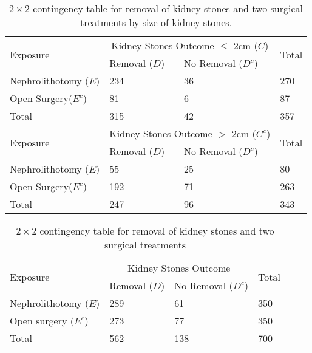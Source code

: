 \begin{customArrayStretch}{1.2}
\begin{table}[H]
    \centering
    \begin{tabular}{|l|l|l|l|}
        \hline
        \multirow{2}{*}{Exposure} & \multicolumn{2}{c|}{Kidney Stones Outcome $\leq$ 2cm ($C$)} & \multirow{2}{*}{Total}\\
        \cline{2-3}
        & Removal ($D$) & No Removal ($D^c$) & \\
        \hline
        Nephrolithotomy ($E$) & 234 & 36 & 270 \\ \hline
        Open Surgery($E^c$) & 81 & 6 & 87 \\ \hline
        Total & 315 & 42 & 357 \\

        \hline \hline

        \hline
        \multirow{2}{*}{Exposure} & \multicolumn{2}{c|}{Kidney Stones Outcome $>$ 2cm ($C^c$)} & \multirow{2}{*}{Total}\\
        \cline{2-3}
        & Removal ($D$) & No Removal ($D^c$) & \\
        \hline

        Nephrolithotomy ($E$) & 55 & 25 & 80 \\ \hline
        Open Surgery($E^c$) & 192 & 71 & 263 \\ \hline
        Total & 247 & 96 & 343 \\ \hline
    \end{tabular}
    \caption{
        $2 \times 2$ contingency table for removal of kidney stones and two surgical treatments by size of kidney stones.
        \cite{statistics/book/Statistics-for-Data-Scientists/Maurits-Kaptein}
    }
\end{table}

\begin{table}[H]
    \centering
    \begin{tabular}{|l|l|l|l|}
        \hline
        \multirow{2}{*}{Exposure} & \multicolumn{2}{c|}{Kidney Stones Outcome} & \multirow{2}{*}{Total}\\
        \cline{2-3}
        & Removal ($D$) & No Removal ($D^c$) & \\
        \hline

        Nephrolithotomy ($E$) & 289 & 61 & 350 \\ \hline
        Open surgery ($E^c$) & 273 & 77 & 350 \\ \hline
        Total & 562 & 138 & 700 \\ \hline
    \end{tabular}
    \caption{
        $2 \times 2$ contingency table for removal of kidney stones and two surgical treatments
        \cite{statistics/book/Statistics-for-Data-Scientists/Maurits-Kaptein}
    }
\end{table}
\end{customArrayStretch}


